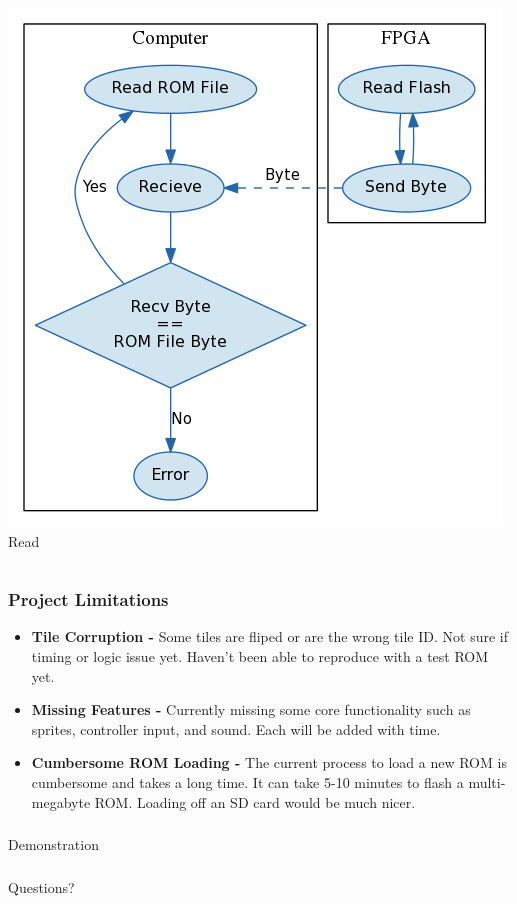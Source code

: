 \documentclass[xcolor=table]{beamer}
\newlength{\wideitemsep}
\let\olditem\item
\renewcommand{\item}{\setlength{\itemsep}{\wideitemsep}\olditem}
\begin{document}
\begin{frame}
\begin{columns}[c]
\begin{center}
            \includegraphics[width=\textwidth]{../../fpga/rom_flasher/doc/block_diagram_read.png} \\
            Read
        \end{center}
    \end{columns}
\end{frame}

\begin{frame}
    \frametitle{Project Limitations}
    \begin{itemize}
        \item<1-> \textbf{Tile Corruption - } Some tiles are fliped or are the
            wrong tile ID. Not sure if timing or logic issue yet. Haven't been
            able to reproduce with a test ROM yet.
        \item<2-> \textbf{Missing Features -} Currently missing some core
            functionality such as sprites, controller input, and sound. Each
            will be added with time.
        \item<3-> \textbf{Cumbersome ROM Loading -} The current process to load
            a new ROM is cumbersome and takes a long time. It can take 5-10
            minutes to flash a multi-megabyte ROM. Loading off an SD card would be
            much nicer.
    \end{itemize}
\end{frame}

\begin{frame}
    \frametitle{}
    \begin{center}
        \Huge
        Demonstration
    \end{center}
\end{frame}

\begin{frame}
    \frametitle{}
    \begin{center}
        \Huge
        Questions?
    \end{center}
\end{frame}

\newpage
\end{document}
